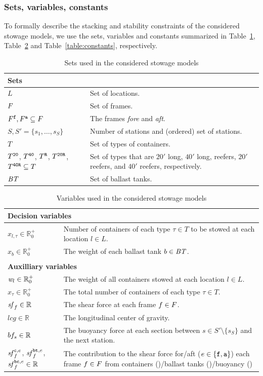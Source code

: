 \subsubsection*{Sets, variables, constants}
To formally describe the stacking and stability constraints of the considered stowage models, we use the sets, variables and constants summarized in Table~\ref{table:sets}, Table~\ref{table:vars} and Table~\ref{table:constants}, respectively.
\begin{table}[p]
\centering
\begin{tabular}{p{5cm}p{7.5cm}}%
\multicolumn{2}{l}{\textbf{Sets}}\\
\hline\noalign{\smallskip}
$L$ 
	& Set of locations.\\
$F$
	&Set of frames.\\
$F^{\texttt{f}},F^{\texttt{a}}\subseteq F$
	&The frames \emph{fore} and \emph{aft}.\\
$S, S' = \{s_1,\ldots, s_S\}$ 
	&Number of stations and (ordered) set of stations.\\
$T$
	&Set of types of containers.\\ 
$T^{\texttt{20}}$, $T^{\texttt{40}}$, $T^{\texttt{R}}$, $T^{\texttt{20R}}$, $T^{\texttt{40R}}\subseteq T$ 
	&Set of types that are $20'$ long, $40'$ long, reefers, $20'$ reefers, and $40'$ reefers, respectively.\\ 
$\mathit{BT}$ 
	& Set of ballast tanks.\\
\end{tabular}
\caption{Sets used in the considered stowage models}
\label{table:sets}
\end{table}
%
\begin{table}[p]
\centering
\begin{tabular}{p{3.5cm}p{9cm}}
\multicolumn{2}{l}{\textbf{Decision variables}}\\
\hline
$x_{l,\tau}\in \mathbb{R}^+_0$
		&Number of containers of each type $\tau\in T$ to be stowed at each location $l\in L$.\\
$x_b\in \mathbb{R}^+_0$
		& The weight of each ballast tank $b\in \mathit{BT}$.\\
\\
\multicolumn{2}{l}{\textbf{Auxilliary variables}}\\
\hline
$\mathit{w}_l\in \mathbb{R}^+_0$
		&The weight of all containers stowed at each location $l\in L$.\\
$x_\tau\in \mathbb{R}^+_0$
		&The total number of containers of each type $\tau\in T$.\\
$\mathit{sf}_f\in \mathbb{R}$
		&{The shear force at each frame $f\in F$}.\\
$lcg\in\mathbb{R}$
		&{The longitudinal center of gravity}.\\
$bf_s \in\mathbb{R}$
		&{The buoyancy force at each section between $s\in S'\setminus\{s_S\}$ and the next station.}\\
$\mathit{sf}_f^{\texttt{c},e}$, $\mathit{sf}_f^{\texttt{bt},e}$, $\mathit{sf}_f^{\texttt{bc},e}\in\mathbb{R}$
		&The contribution to the shear force for/aft (${e}\in\{\texttt{f},\texttt{a}\}$) each frame $f\in F$ from containers (\trt{c})/ballast tanks (\trt{bt})/buoyancy (\trt{bc})
\end{tabular}
\caption{Variables used in the considered stowage models}\label{table:vars}
\end{table}
